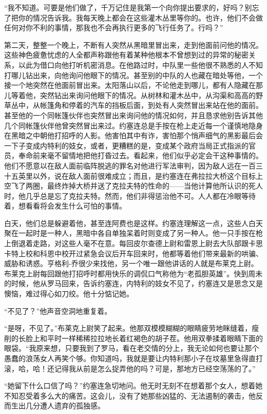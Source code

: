     “我不知道。可要是他们做了，千万记住是我第一个向你提出要求的，好吗？别忘了把你的情况告诉我。我每天晚上都会在这些灌木丛里等你的。也许，他们不会做任何对你不利的事情，那我也不会再执行更多的飞行任务了。行吗？”

    第二天，整整一个晚上，不断有人突然从黑暗里冒出来，走到他面前问他的情况。这些神色疲惫忧虑的人全都声称跟他有着某种他根本不曾想到过的异常的秘密关系，以此为借口向他打听机密消息。在他路过时，中队里一些他很不熟悉的人不知打哪儿钻出来，向他询问他眼下的情况。甚至别的中队的人也藏在暗处等他，一个接一个地突然在他面前冒出来。太阳落山以后，不论他走到哪儿，都有人隐藏在那儿等着他，突然钻出来询问他眼下的情况。从树林和灌木丛中，从沟渠和高高的野草丛中，从帐篷角和停着的汽车的挡板后面，到处有人突然冒出来站在他的面前。甚至他的一个同帐篷伙伴也突然冒出来询问他的情况如何，并且恳求他别告诉其他几个同帐篷伙伴他曾突然冒出来过。约塞连总是手按在枪上走近每一个谨慎地隐身在黑暗之中朝他打招呼的人影。他害怕其中有诈，害怕那个悄声细气的黑影最后会一下子变成内特利的妓女，或者，更糟糕的是，变成某个政府当局正式指派的官员，奉命前来毫不留情地把他打昏过去。看起来，他们似乎必定会干这种事情的。他们不愿意以在敌人面前临阵脱逃的罪名对他进行军法审判，因为敌人远在一百三十五英里以外，说在敌人面前很难成立；而且，是约塞连在弗拉拉大桥这个目标上空飞了两圈，最终炸掉大桥并送了克拉夫特的性命的——当他计算他所认识的死人时，他几乎总是忘了克拉夫特。然而，他们非得惩治他不可。人人都在冷眼等待着，想看看将会发生什么可怕的事情。
 


    白天，他们总是躲避着他，甚至连阿费也是这样。约塞连理解这一点，这些人白天聚在一起时是一种人，黑暗中各自单独呆着时则变成了另一种人。他一只手按在枪上倒退着走路，对这些人毫不在意。每回皮尔查德上尉和雷恩上尉去大队部跟卡思卡特上校和科恩中校开过紧急会议后开车回来时，他都等着他们带来最新的哄骗、威胁和诱惑。亨格利-乔很少来找他，另一个唯一跟他讲话的人就是布莱克上尉。布莱克上尉每回跟他打招呼时都用快乐的调侃口气称他为“老孤胆英雄”。快到周未的时候，他从罗马回来，告诉约塞连，内特利的妓女不见了，约塞连又是思念又是懊恼，难过得心如刀绞。他十分惦记她。

    “不见了？”他声音空洞地重复着。

    “是呀，不见了。”布莱克上尉笑了起来。他那双模模糊糊的眼睛疲劳地眯缝着，瘦削的长脸上和平时一样稀稀拉拉地长着红褐色的胡子茬。他用双拳揉着眼睛下面的眼袋。“我原来想，只要我到了罗马，看在老交情的分上，我无论如何也要让那个愚蠢的浪荡女人再笑个够。你知道吗，我就是要让内特利那小子在坟墓里急得直打滚，哈，哈！还记得我从前是怎么捉弄他的吗？可是，那地方已经空荡荡的了。”

    “她留下什么口信了吗？”约塞连急切地问。他无时无刻不在想着那个女人，想着她不知忍受着多么大的痛苦。这会儿，没有了她那些凶猛的、无法遏制的袭击，他反而生出几分遭人遗弃的孤独感。

